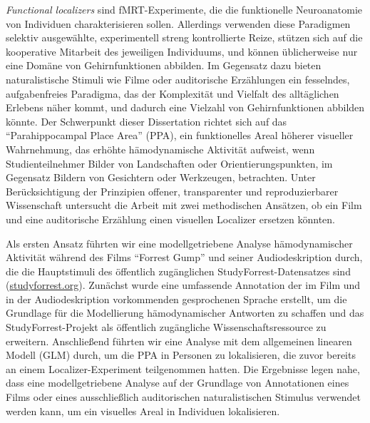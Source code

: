 \textit{Functional localizers} sind fMRT-Experimente, die die funktionelle
Neuroanatomie von Individuen charakterisieren sollen.
Allerdings verwenden diese Paradigmen selektiv ausgewählte, experimentell
streng kontrollierte Reize, stützen sich auf die kooperative Mitarbeit des
jeweiligen Individuums, und können üblicherweise nur eine Domäne von
Gehirnfunktionen abbilden.
%
Im Gegensatz dazu bieten naturalistische Stimuli wie Filme oder auditorische
Erzählungen ein fesselndes, aufgabenfreies Paradigma, das der Komplexität und
Vielfalt des alltäglichen Erlebens näher kommt, und dadurch eine Vielzahl von
Gehirnfunktionen abbilden könnte.
Der Schwerpunkt dieser Dissertation richtet sich auf das ``Parahippocampal
Place Area'' (PPA), ein funktionelles Areal höherer visueller Wahrnehmung, das
erhöhte hämodynamische Aktivität aufweist, wenn Studienteilnehmer Bilder von
Landschaften oder Orientierungspunkten, im Gegensatz Bildern von Gesichtern
oder Werkzeugen, betrachten.
%
Unter Berücksichtigung der Prinzipien offener, transparenter und
reproduzierbarer Wissenschaft untersucht die Arbeit mit zwei methodischen
Ansätzen, ob ein Film und eine auditorische Erzählung einen visuellen Localizer
ersetzen könnten.

Als ersten Ansatz führten wir eine modellgetriebene Analyse hämodynamischer
Aktivität während des Films ``Forrest Gump'' und seiner Audiodeskription durch,
die die Hauptstimuli des öffentlich zugänglichen StudyForrest-Datensatzes sind
(\href{www.studyforrest.org}{\url{studyforrest.org}}).
%
Zunächst wurde eine umfassende Annotation der im Film und in der
Audiodeskription vorkommenden gesprochenen Sprache erstellt, um die Grundlage
für die Modellierung hämodynamischer Antworten zu schaffen und das
StudyForrest-Projekt als öffentlich zugängliche Wissenschaftsressource zu
erweitern.
%
Anschließend führten wir eine Analyse mit dem allgemeinen
linearen Modell (GLM) durch, um die PPA in Personen zu lokalisieren, die zuvor
bereits an einem Localizer-Experiment teilgenommen hatten.
Die Ergebnisse legen nahe, dass eine modellgetriebene Analyse auf der Grundlage
von Annotationen eines Films oder eines ausschließlich auditorischen
naturalistischen Stimulus verwendet werden kann, um ein visuelles Areal in
Individuen lokalisieren.


